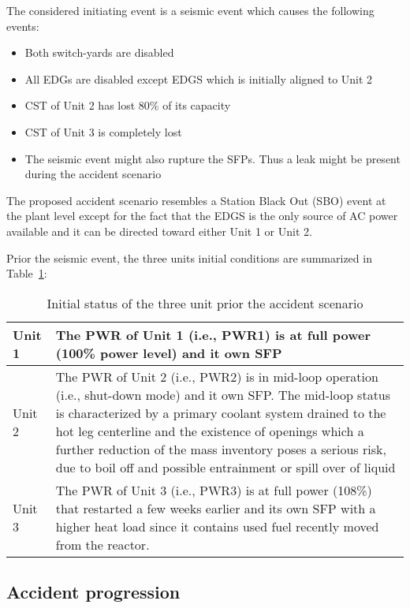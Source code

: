 The considered initiating event is a seismic event which causes the following events:
\begin{itemize}
  \item Both switch-yards are disabled
  \item All EDGs are disabled except EDGS which is initially aligned to Unit 2
  \item CST of Unit 2 has lost 80\% of its capacity 
  \item CST of Unit 3 is completely lost
  \item The seismic event might also rupture the SFPs. Thus a leak might be present during the accident scenario
\end{itemize}

The proposed accident scenario resembles a Station Black Out (SBO) event at the plant level except for the 
fact that the EDGS is the only source of AC power available and it can be directed toward either Unit 1 or Unit 2.

Prior the seismic event, the three units initial conditions are summarized in Table~\ref{tab:unitsStatus}:

\begin{table}
  \begin{tabular}{ | l | p{10cm} | }
    \hline      
      Unit 1 &  The PWR of Unit 1 (i.e., PWR1) is at full power (100\% power level) and it own SFP \\ \hline
      Unit 2 &  The PWR of Unit 2 (i.e., PWR2) is in mid-loop operation (i.e., shut-down mode) and it own SFP. 
                The mid-loop status is characterized by a primary coolant system drained to the 
                hot leg centerline and the existence of openings which a further reduction of 
                the mass inventory poses a serious risk, due to boil off and possible entrainment 
                or spill over of liquid\\ \hline
      Unit 3 &  The PWR of Unit 3 (i.e., PWR3) is at full power (108\%) that restarted a few weeks 
                earlier and its own SFP with a higher heat load since it contains used fuel recently 
                moved from the reactor. \\
    \hline  
  \end{tabular}
  \caption{Initial status of the three unit prior the accident scenario}
  \label{tab:unitsStatus}
\end{table}

\subsection{Accident progression}
\label{sec:accidentProgression}

